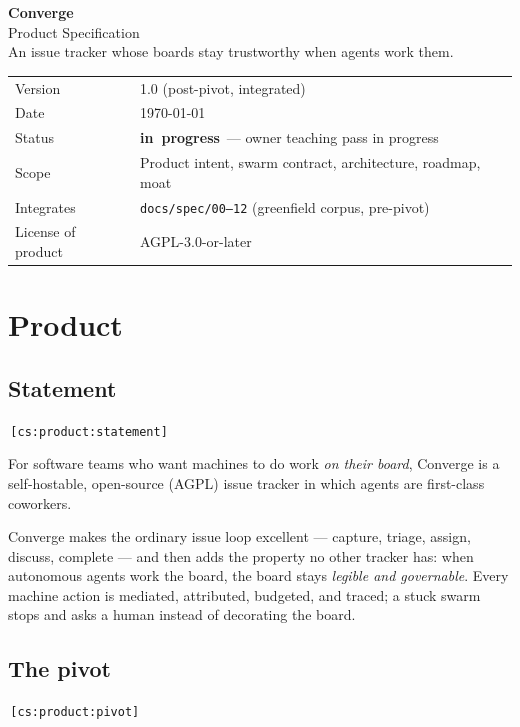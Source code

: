 \documentclass[11pt,a4paper]{report}
\newcommand{\cs}[1]{\,\texttt{\scriptsize[cs:#1]}\label{cs:#1}}
\newcommand{\inprogress}{\textbf{\textcolor{orange!70!black}{in\ progress}}}
\begin{document}
\begin{titlepage}
\begin{center}
{\Huge\bfseries Converge}\\[0.6cm]
{\LARGE Product Specification}\\[1.2cm]
{\large An issue tracker whose boards stay trustworthy
when agents work them.}\\[1.6cm]
\begin{tabular}{ll}
\toprule
Version & 1.0 (post-pivot, integrated)\\
Date & \today\\
Status & \inprogress\ --- owner teaching pass in progress\\
Scope & Product intent, swarm contract, architecture, roadmap, moat\\
Integrates & \texttt{docs/spec/00--12} (greenfield corpus, pre-pivot)\\
License of product & AGPL-3.0-or-later\\
\bottomrule
\end{tabular}
\end{center}
\end{titlepage}

\tableofcontents
\newpage

\chapter{Product}
\label{ch:product}

\section{Statement}
\cs{product:statement}

For software teams who want machines to do work \emph{on their board},
Converge is a self-hostable, open-source (AGPL) issue tracker in which
agents are first-class coworkers.

Converge makes the ordinary issue loop excellent --- capture, triage,
assign, discuss, complete --- and then adds the property no other tracker
has: when autonomous agents work the board, the board stays \emph{legible
and governable}. Every machine action is mediated, attributed, budgeted,
and traced; a stuck swarm stops and asks a human instead of decorating
the board.

\section{The pivot}
\cs{product:pivot}
\end{document}

